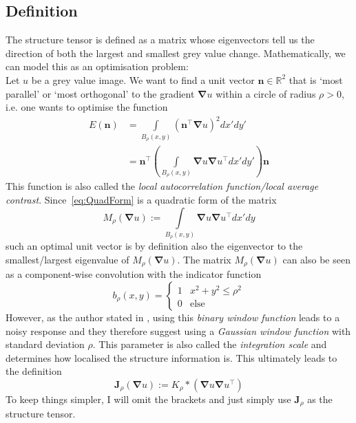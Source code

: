 \subsection{Definition}
The structure tensor is defined as a matrix whose eigenvectors tell us the direction of
both the largest and smallest grey value change. Mathematically, we can model this
as an optimisation problem:\\
Let $u$ be a grey value image.
We want to find a unit vector $\mathbf{n} \in \mathbb{R}^2$ that is `most parallel' or `most orthogonal' to the
gradient $\boldsymbol\nabla u$ within a circle of radius $\rho > 0$, i.e. one wants to optimise the
function
\begin{align}
    E(\mathbf{n}) &= \int\limits_{B_\rho(x, y)} \left(\mathbf{n}^\top\boldsymbol\nabla u\right)^2dx'dy'\\
    &= \mathbf{n}^\top \left(\int\limits_{B_\rho(x, y)} \boldsymbol\nabla u \boldsymbol\nabla
        u^\top dx'dy' \right) \mathbf{n}\label{eq:QuadForm}
\end{align}
This function is also called the \textit{local autocorrelation function/local average
    contrast}\cite{harris88, ipcv19-13}.
Since~\eqref{eq:QuadForm} is a quadratic form of the matrix
\[M_\rho(\boldsymbol\nabla u) := \int\limits_{B_\rho(x, y)} \boldsymbol\nabla u \boldsymbol\nabla
    u^\top dx'dy\]
such an optimal unit vector is by definition also the eigenvector to the smallest/largest
eigenvalue of $M_\rho(\boldsymbol\nabla u)$\cite{ipcv19-13}.
The matrix $M_\rho(\boldsymbol\nabla u)$ can also be seen as a component-wise convolution with the indicator
function
\[b_\rho(x, y) = \begin{cases} 1 & x^2 + y^2 \leq \rho^2\\ 0 & \text{else} \end{cases}\]
However, as the author stated in \cite{harris88}, using this \textit{binary window function} leads
to a noisy response and they therefore suggest using a \textit{Gaussian window function} with standard
deviation $\rho$. This parameter is also
called the \textit{integration scale} and determines how localised the structure information
is\cite{ipcv19-13}.
This ultimately leads to the definition
\begin{equation}
    \mathbf{J}_\rho(\boldsymbol\nabla u) := K_\rho * (\boldsymbol\nabla u\boldsymbol\nabla u^\top)
\end{equation}
To keep things simpler, I will omit the brackets and just simply use $\mathbf{J}_\rho$ as the
structure tensor.
